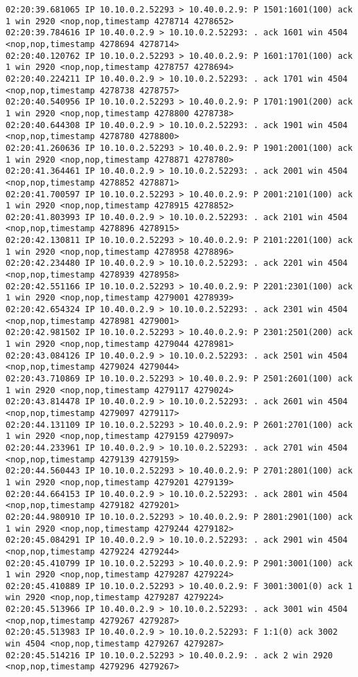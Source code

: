 \documentclass[a4paper,12pt]{article}
\begin{document}
\begin{Verbatim}
02:20:39.681065 IP 10.10.0.2.52293 > 10.40.0.2.9: P 1501:1601(100) ack 1 win 2920 <nop,nop,timestamp 4278714 4278652>
02:20:39.784616 IP 10.40.0.2.9 > 10.10.0.2.52293: . ack 1601 win 4504 <nop,nop,timestamp 4278694 4278714>
02:20:40.120762 IP 10.10.0.2.52293 > 10.40.0.2.9: P 1601:1701(100) ack 1 win 2920 <nop,nop,timestamp 4278757 4278694>
02:20:40.224211 IP 10.40.0.2.9 > 10.10.0.2.52293: . ack 1701 win 4504 <nop,nop,timestamp 4278738 4278757>
02:20:40.540956 IP 10.10.0.2.52293 > 10.40.0.2.9: P 1701:1901(200) ack 1 win 2920 <nop,nop,timestamp 4278800 4278738>
02:20:40.644308 IP 10.40.0.2.9 > 10.10.0.2.52293: . ack 1901 win 4504 <nop,nop,timestamp 4278780 4278800>
02:20:41.260636 IP 10.10.0.2.52293 > 10.40.0.2.9: P 1901:2001(100) ack 1 win 2920 <nop,nop,timestamp 4278871 4278780>
02:20:41.364461 IP 10.40.0.2.9 > 10.10.0.2.52293: . ack 2001 win 4504 <nop,nop,timestamp 4278852 4278871>
02:20:41.700597 IP 10.10.0.2.52293 > 10.40.0.2.9: P 2001:2101(100) ack 1 win 2920 <nop,nop,timestamp 4278915 4278852>
02:20:41.803993 IP 10.40.0.2.9 > 10.10.0.2.52293: . ack 2101 win 4504 <nop,nop,timestamp 4278896 4278915>
02:20:42.130811 IP 10.10.0.2.52293 > 10.40.0.2.9: P 2101:2201(100) ack 1 win 2920 <nop,nop,timestamp 4278958 4278896>
02:20:42.234480 IP 10.40.0.2.9 > 10.10.0.2.52293: . ack 2201 win 4504 <nop,nop,timestamp 4278939 4278958>
02:20:42.551166 IP 10.10.0.2.52293 > 10.40.0.2.9: P 2201:2301(100) ack 1 win 2920 <nop,nop,timestamp 4279001 4278939>
02:20:42.654324 IP 10.40.0.2.9 > 10.10.0.2.52293: . ack 2301 win 4504 <nop,nop,timestamp 4278981 4279001>
02:20:42.981502 IP 10.10.0.2.52293 > 10.40.0.2.9: P 2301:2501(200) ack 1 win 2920 <nop,nop,timestamp 4279044 4278981>
02:20:43.084126 IP 10.40.0.2.9 > 10.10.0.2.52293: . ack 2501 win 4504 <nop,nop,timestamp 4279024 4279044>
02:20:43.710869 IP 10.10.0.2.52293 > 10.40.0.2.9: P 2501:2601(100) ack 1 win 2920 <nop,nop,timestamp 4279117 4279024>
02:20:43.814478 IP 10.40.0.2.9 > 10.10.0.2.52293: . ack 2601 win 4504 <nop,nop,timestamp 4279097 4279117>
02:20:44.131109 IP 10.10.0.2.52293 > 10.40.0.2.9: P 2601:2701(100) ack 1 win 2920 <nop,nop,timestamp 4279159 4279097>
02:20:44.233961 IP 10.40.0.2.9 > 10.10.0.2.52293: . ack 2701 win 4504 <nop,nop,timestamp 4279139 4279159>
02:20:44.560443 IP 10.10.0.2.52293 > 10.40.0.2.9: P 2701:2801(100) ack 1 win 2920 <nop,nop,timestamp 4279201 4279139>
02:20:44.664153 IP 10.40.0.2.9 > 10.10.0.2.52293: . ack 2801 win 4504 <nop,nop,timestamp 4279182 4279201>
02:20:44.980910 IP 10.10.0.2.52293 > 10.40.0.2.9: P 2801:2901(100) ack 1 win 2920 <nop,nop,timestamp 4279244 4279182>
02:20:45.084291 IP 10.40.0.2.9 > 10.10.0.2.52293: . ack 2901 win 4504 <nop,nop,timestamp 4279224 4279244>
02:20:45.410799 IP 10.10.0.2.52293 > 10.40.0.2.9: P 2901:3001(100) ack 1 win 2920 <nop,nop,timestamp 4279287 4279224>
02:20:45.410889 IP 10.10.0.2.52293 > 10.40.0.2.9: F 3001:3001(0) ack 1 win 2920 <nop,nop,timestamp 4279287 4279224>
02:20:45.513966 IP 10.40.0.2.9 > 10.10.0.2.52293: . ack 3001 win 4504 <nop,nop,timestamp 4279267 4279287>
02:20:45.513983 IP 10.40.0.2.9 > 10.10.0.2.52293: F 1:1(0) ack 3002 win 4504 <nop,nop,timestamp 4279267 4279287>
02:20:45.514216 IP 10.10.0.2.52293 > 10.40.0.2.9: . ack 2 win 2920 <nop,nop,timestamp 4279296 4279267>
\end{Verbatim}
\end{document}
